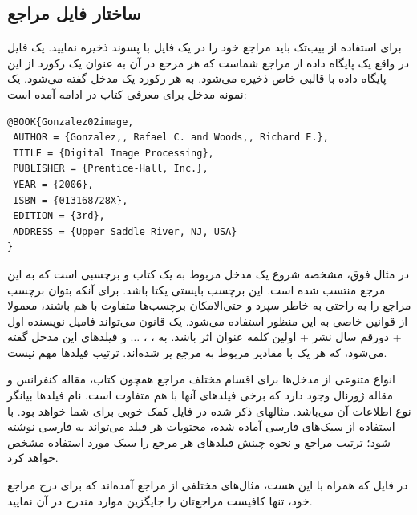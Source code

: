 \subsection{ساختار فایل مراجع}\label{app:bibref}
برای استفاده از بیب‌تک باید مراجع خود را در یک فایل با پسوند  ذخیره نمایید. یک فایل  در واقع یک پایگاه داده از مراجع%
شماست که هر مرجع در آن به عنوان یک رکورد از این پایگاه داده
با قالبی خاص ذخیره می‌شود. به هر رکورد یک مدخل%
گفته می‌شود. یک نمونه مدخل برای معرفی کتاب  در ادامه آمده است:

\singlespacing
\begin{LTR}
\begin{verbatim}
@BOOK{Gonzalez02image,
 AUTHOR = {Gonzalez,, Rafael C. and Woods,, Richard E.},
 TITLE = {Digital Image Processing},
 PUBLISHER = {Prentice-Hall, Inc.},
 YEAR = {2006},
 ISBN = {013168728X},
 EDITION = {3rd},
 ADDRESS = {Upper Saddle River, NJ, USA}
}
\end{verbatim}
\end{LTR}
\doublespacing

در مثال فوق،  مشخصه شروع یک مدخل مربوط به یک کتاب و  برچسبی است که به این مرجع منتسب شده است.
 این برچسب بایستی یکتا باشد. برای آنکه بتوان
برچسب مراجع
 را به راحتی به خاطر سپرد و حتی‌الامکان برچسب‌ها متفاوت با هم باشند، معمولا از قوانین خاصی به این منظور استفاده می‌شود. یک قانون می‌تواند
فامیل نویسنده اول + دورقم سال نشر + اولین کلمه عنوان اثر
باشد. به
، ، $\dots$ و 
فیلدهای این مدخل گفته می‌شود، که هر یک با مقادیر مربوط به مرجع پر شده‌اند. ترتیب فیلدها مهم نیست.

انواع متنوعی از مدخل‌ها برای اقسام مختلف مراجع همچون کتاب، مقاله کنفرانس و مقاله ژورنال وجود دارد که برخی فیلدهای آنها با هم متفاوت است.
نام فیلدها بیانگر نوع اطلاعات آن می‌باشد. مثالهای ذکر شده در فایل  کمک خوبی برای شما خواهد بود.
با استفاده از سبک‌های فارسی آماده شده، محتویات هر فیلد می‌تواند به فارسی نوشته شود؛ ترتیب مراجع و نحوه چینش فیلدهای هر مرجع را سبک مورد استفاده مشخص خواهد کرد.

در فایل
 که همراه با این \پ هست، مثال‌های مختلفی از مراجع آمده‌اند که برای درج مراجع خود، تنها کافیست مراجع‌تان را جایگزین موارد مندرج در آن نمایید.


